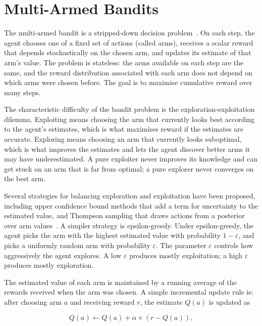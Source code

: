 \section{Multi-Armed Bandits}
\label{sec:bg-bandits}

The multi-armed bandit is a stripped-down decision problem~\cite{sutton_reinforcement_1998,lattimore_bandit_2020}. On each step, the agent chooses one of a fixed set of actions (called arms), receives a scalar reward that depends stochastically on the chosen arm, and updates its estimate of that arm's value. The problem is stateless: the arms available on each step are the same, and the reward distribution associated with each arm does not depend on which arms were chosen before. The goal is to maximise cumulative reward over many steps.

The characteristic difficulty of the bandit problem is the exploration-exploitation dilemma. Exploiting means choosing the arm that currently looks best according to the agent's estimates, which is what maximises reward if the estimates are accurate. Exploring means choosing an arm that currently looks suboptimal, which is what improves the estimates and lets the agent discover better arms it may have underestimated. A pure exploiter never improves its knowledge and can get stuck on an arm that is far from optimal; a pure explorer never converges on the best arm.

Several strategies for balancing exploration and exploitation have been proposed, including upper confidence bound methods that add a term for uncertainty to the estimated value, and Thompson sampling that draws actions from a posterior over arm values~\cite{lattimore_bandit_2020,auer_finite-time_2002,thompson_likelihood_1933}. A simpler strategy is epsilon-greedy. Under epsilon-greedy, the agent picks the arm with the highest estimated value with probability $1 - \varepsilon$, and picks a uniformly random arm with probability $\varepsilon$. The parameter $\varepsilon$ controls how aggressively the agent explores. A low $\varepsilon$ produces mostly exploitation; a high $\varepsilon$ produces mostly exploration.

The estimated value of each arm is maintained by a running average of the rewards received when the arm was chosen. A simple incremental update rule is: after choosing arm $a$ and receiving reward $r$, the estimate $Q(a)$ is updated as

\begin{equation}
Q(a) \leftarrow Q(a) + \alpha \times (r - Q(a)),
\end{equation}

